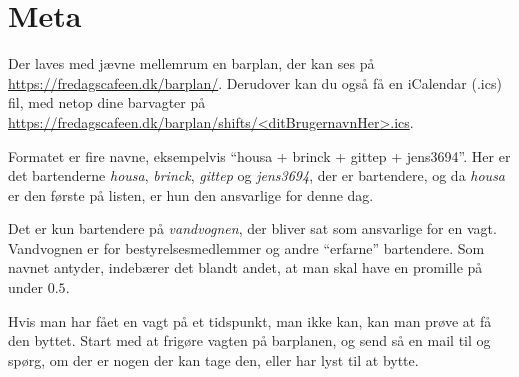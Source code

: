 \section{Meta}
\label{sec:meta}

Der laves med jævne mellemrum en barplan, der kan ses på
\url{https://fredagscafeen.dk/barplan/}. Derudover kan du også få en
iCalendar (.ics) fil, med netop dine barvagter på
\url{https://fredagscafeen.dk/barplan/shifts/<ditBrugernavnHer>.ics}.

Formatet er fire navne, eksempelvis ``housa + brinck +
gittep + jens3694''. Her er det bartenderne \emph{housa},
\emph{brinck}, \emph{gittep} og \emph{jens3694}, der er bartendere, og
da \emph{housa} er den første på listen, er hun den ansvarlige for
denne dag.

Det er kun bartendere på \emph{vandvognen}, der bliver sat som
ansvarlige for en vagt. Vandvognen er for bestyrelsesmedlemmer
og andre ``erfarne'' bartendere. Som navnet antyder, indebærer det
blandt andet, at man skal have en promille på under $0.5$. 

Hvis man har fået en vagt på et tidspunkt, man ikke kan, kan man prøve
at få den byttet. Start med at frigøre vagten på barplanen, 
og send så en mail til \allemail og
spørg, om der er nogen der kan tage den, eller har lyst til at bytte.

